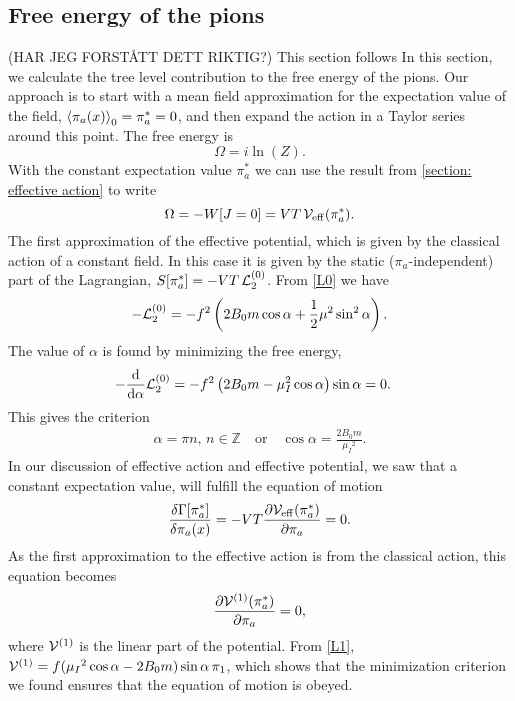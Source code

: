 \subsection{Free energy of the pions}
(HAR JEG FORSTÅTT DETT RIKTIG?)
This section follows \cite{Andersen:two-flavor-chpt,mojahed}
In this section, we calculate the tree level contribution to the free energy of the pions.
Our approach is to start with a mean field approximation for the expectation value of the field, $\ex{\pi_a(x)}_0 = \pi^*_a = 0$, and then expand the action in a Taylor series around this point.
The free energy is 
\begin{equation}
    \Omega = i \ln(Z).
\end{equation}
With the constant expectation value $\pi^*_a$ we can use the result from \autoref{section: effective action} to write
\begin{equation}
    \Omega = -W[J=0] = V T \, \mathcal{V}_{\mathrm{eff}}(\pi^*_a).
\end{equation}
The first approximation of the effective potential, which is given by the classical action of a constant field.
In this case it is given by the static ($\pi_a$-independent) part of the Lagrangian, $S[\pi^*_a] = -V T \, \mathcal{L}_2^{(0)}$.
From \autoref{L0} we have
\begin{equation}
    - \mathcal{L}_2^{(0)} = 
    -f^2   
    \left(
        2B_0m \cos{\alpha}
        + \frac{1}{2} \mu^2 \sin^2{\alpha}
    \right).
\end{equation}
The value of $\alpha$ is found by minimizing the free energy,
\begin{align*}
    -&\dv{\alpha} \mathcal{L}_2^{(0)} 
    = - f^2\left(2B_0m - \mu_I^2\cos{\alpha}\right)\sin{\alpha}
    = 0.
\end{align*}
This gives the criterion
\begin{align}
    \alpha = \pi n, \, n \in \mathbb{Z} \quad
    \mathrm{or} \quad
    \cos{\alpha} = \frac{2B_0m}{\mu_I{}^2}.
\end{align}
In our discussion of effective action and effective potential, we saw that a constant expectation value, will fulfill the equation of motion
\begin{equation}
    \frac{\delta \Gamma[\pi^*_a]}{\delta \pi_a(x)}
    = - V T \pdv{\mathcal{V}_{\mathrm{eff}}(\pi^*_a)}{\pi_a} = 0.
\end{equation}
As the first approximation to the effective action is from the classical action, this equation becomes
\begin{equation}
    \pdv{\mathcal{V}^{(1)}(\pi^*_a)}{\pi_a} = 0,
\end{equation}
where $\mathcal{V}^{(1)}$ is the linear part of the potential. 
From \autoref{L1}, $\mathcal{V}^{(1)} = f(\mu_I{}^2\cos{\alpha} - 2B_0m)\sin{\alpha} \, \pi_1 $, which shows that the minimization criterion we found ensures that the equation of motion is obeyed.

